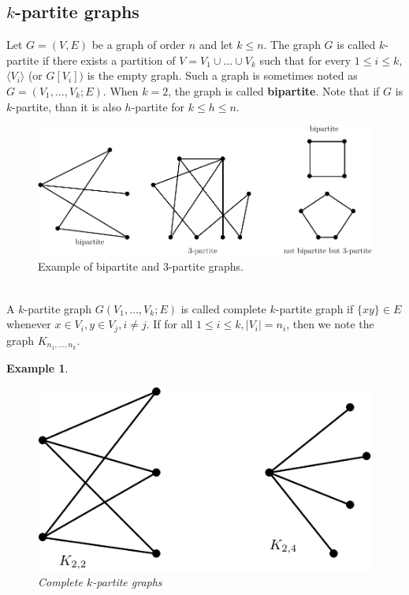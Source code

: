 \documentclass[12pt,a4paper]{article}
\newtheorem{exmp}{Example}[section]
\theoremstyle{definition}
\begin{document}
\subsection{$k$-partite graphs}
Let $G=(V,E)$ be a graph of order $n$ and let $k \leq n$. The graph $G$ is called $k$-partite if there exists a partition of $V= V_1 \cup  \dots \cup V_k$ such that for every $1 \leq i \leq k$, $\langle V_i \rangle$ (or $G[V_i])$ is the empty graph. Such a graph is sometimes noted as $G=(V_1, \dots , V_k;E)$. When $k=2$, the graph is called \textbf{bipartite}. Note that if $G$ is $k$-partite, than it is also $h$-partite for $k \leq h \leq n$. 
\begin{figure}[hbtp]
\centering
\includegraphics[scale=.9]{images/graph17.pdf}
\caption{Example of bipartite and $3$-partite graphs.}
\end{figure}
\\
A $k$-partite graph $G(V_1, \dots , V_k; E)$ is called complete $k$-partite graph if $\{xy\} \in E$ whenever $x \in V_i,  y \in V_j, i \neq j$. If for all $1 \leq i \leq k, |V_i| = n_i$, then we note the graph $K_{n_1, \dots , n_k}$.
\begin{exmp} \
\begin{figure}[hbtp]
\centering
\includegraphics[scale=.9]{images/graph18.pdf}
\caption{Complete $k$-partite graphs}
\end{figure}
\end{exmp}
\newpage
\end{document}
